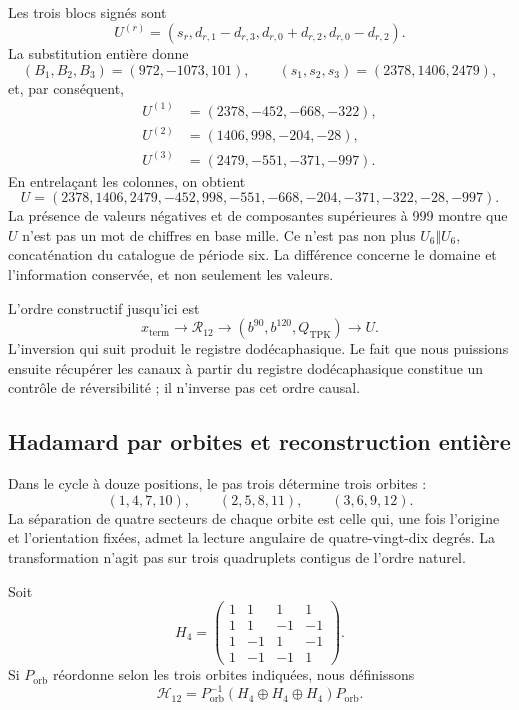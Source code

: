 Les trois blocs signés sont
\begin{equation}
 U^{(r)}=(s_r,d_{r,1}-d_{r,3},d_{r,0}+d_{r,2},d_{r,0}-d_{r,2}).
 \label{eq:k-bloques-firmados}
\end{equation}
La substitution entière donne
\[
 (B_1,B_2,B_3)=(972,-1073,101),\qquad
 (s_1,s_2,s_3)=(2378,1406,2479),
\]
et, par conséquent,
\begin{align*}
 U^{(1)}&=(2378,-452,-668,-322),\\
 U^{(2)}&=(1406,998,-204,-28),\\
 U^{(3)}&=(2479,-551,-371,-997).
\end{align*}
En entrelaçant les colonnes, on obtient
\begin{equation}
 U=(2378,1406,2479,-452,998,-551,
       -668,-204,-371,-322,-28,-997).
 \label{eq:k-u-firmado}
\end{equation}
La présence de valeurs négatives et de composantes supérieures à 999
montre que \(U\) n'est pas un mot de chiffres en base mille. Ce n'est pas non plus
\(U_6\Vert U_6\), concaténation du catalogue de période six. La différence
concerne le domaine et l'information conservée, et non seulement les valeurs.

L'ordre constructif jusqu'ici est
\[
 x_{\mathrm{term}}\longrightarrow\mathcal R_{12}
 \longrightarrow(b^{90},b^{120},Q_{\mathrm{TPK}})
 \longrightarrow U.
\]
L'inversion qui suit produit le registre dodécaphasique. Le fait que nous puissions ensuite récupérer les canaux à partir du registre dodécaphasique constitue un contrôle de réversibilité ; il n'inverse pas cet ordre causal.

\subsection{Hadamard par orbites et reconstruction entière}
\label{subsec:k-hadamard}

Dans le cycle à douze positions, le pas trois détermine trois orbites :
\[
 (1,4,7,10),\qquad(2,5,8,11),\qquad(3,6,9,12).
\]
La séparation de quatre secteurs de chaque orbite est celle qui, une fois
l'origine et l'orientation fixées, admet la lecture angulaire de quatre-vingt-dix degrés. La
transformation n'agit pas sur trois quadruplets contigus de l'ordre naturel.

Soit
\[
 H_4=\begin{pmatrix}
 1&1&1&1\\1&1&-1&-1\\1&-1&1&-1\\1&-1&-1&1
 \end{pmatrix}.
\]
Si \(P_{\mathrm{orb}}\) réordonne selon les trois orbites indiquées, nous définissons
\[
 \mathcal H_{12}=P_{\mathrm{orb}}^{-1}
 (H_4\oplus H_4\oplus H_4)P_{\mathrm{orb}}.
\]

